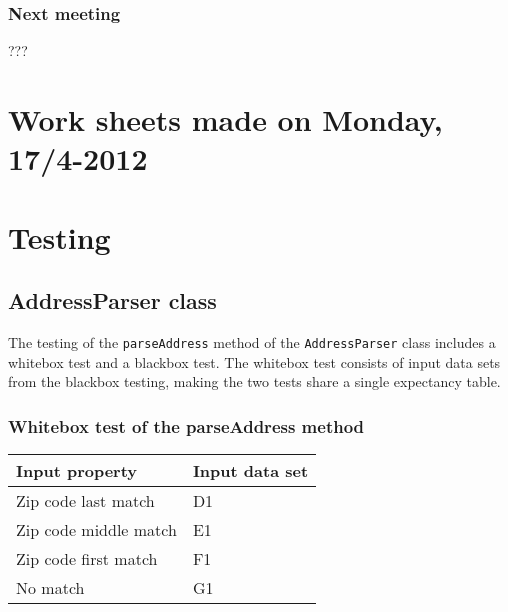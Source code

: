 \documentclass[a4paper,11pt]{article}
\begin{document}
\subsubsection*{Next meeting}
???

\pagebreak
\section{Work sheets made on Monday, 17/4-2012}


\pagebreak
\section{Testing}

\subsection{AddressParser class}
\label{sec:AddressParser test appendix}
The testing of the \texttt{parseAddress} method of the \texttt{AddressParser} class includes a whitebox test and a blackbox test. The whitebox test consists of input data sets from the blackbox testing, making the two tests share a single expectancy table.

\subsubsection{Whitebox test of the parseAddress method}
\begin{tabular}{ p{7cm} | p{4cm}}
	\textbf{Input property} & \textbf{Input data set} \\
	\hline
	Zip code last match & D1 \\
	Zip code middle match & E1 \\
	Zip code first match & F1 \\
	No match & G1
\end{tabular}
\end{document}
